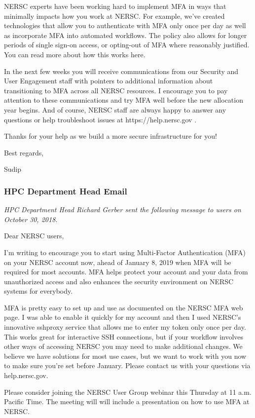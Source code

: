 \documentclass[sigconf,review]{acmart}
\begin{document}
NERSC experts have been working hard to implement MFA in ways that minimally impacts how you work at NERSC. For example, we've created technologies that allow you to authenticate with MFA only once per day as well as incorporate  MFA into automated workflows.  The policy also allows for longer periods of single sign-on access, or opting-out of MFA where reasonably justified. You can read more about how this works here.

In the next few weeks you will receive communications from our Security and User Engagement staff with pointers to additional information about transitioning to MFA across all NERSC resources. I encourage you to pay attention to these communications and try MFA well before the new allocation year begins. And of course, NERSC staff are always happy to answer any questions or help troubleshoot issues at https://help.nersc.gov .

Thanks for your help as we build a more secure infrastructure for you!

Best regards,

Sudip

\subsubsection{HPC Department Head Email}

{\em HPC Department Head Richard Gerber sent the following message to users
on October 30, 2018.}

Dear NERSC users,

I’m writing to encourage you to start using Multi-Factor Authentication (MFA) on your NERSC account now, ahead of January 8, 2019 when MFA will be required for most accounts. MFA helps protect your account and your data from unauthorized access and also enhances the security environment on NERSC systems for everybody. 

MFA is pretty easy to set up and use as documented on the NERSC MFA web page. I was able to enable it quickly for my account and then I used NERSC’s innovative sshproxy service that allows me to enter my token only once per day. This works great for interactive SSH connections, but if your workflow involves other ways of accessing NERSC you may need to make additional changes. We believe we have solutions for most use cases, but we want to work with you now to make sure you’re set before January. Please contact us with your questions via help.nersc.gov. 

Please consider joining the NERSC User Group webinar this Thursday at 11 a.m. Pacific Time. The meeting will will include a presentation on how to use MFA at NERSC.  
\end{document}
